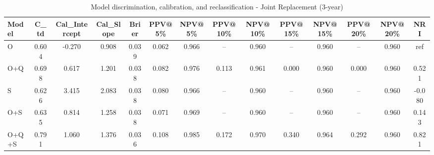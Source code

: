 \begin{table}[htbp]
\centering
\small
\caption{Model discrimination, calibration, and reclassification - Joint Replacement (3-year)}
\label{tab:perf_joint_3y}
\begin{tabular}{lccccccccccccc}
\toprule
Model & C\_td & Cal\_Intercept & Cal\_Slope & Brier & PPV@5\% & NPV@5\% & PPV@10\% & NPV@10\% & PPV@15\% & NPV@15\% & PPV@20\% & NPV@20\% & NRI \\
\midrule
O & 0.604 & -0.270 & 0.908 & 0.039 & 0.062 & 0.966 & -- & 0.960 & -- & 0.960 & -- & 0.960 & ref \\
O+Q & 0.698 & 0.617 & 1.201 & 0.038 & 0.082 & 0.976 & 0.113 & 0.961 & 0.000 & 0.960 & 0.000 & 0.960 & 0.521 \\
S & 0.626 & 3.415 & 2.083 & 0.038 & 0.080 & 0.966 & -- & 0.960 & -- & 0.960 & -- & 0.960 & -0.080 \\
O+S & 0.635 & 0.814 & 1.258 & 0.038 & 0.071 & 0.969 & -- & 0.960 & -- & 0.960 & -- & 0.960 & 0.143 \\
O+Q+S & 0.791 & 1.060 & 1.376 & 0.036 & 0.108 & 0.985 & 0.172 & 0.970 & 0.340 & 0.964 & 0.292 & 0.960 & 0.821 \\
\bottomrule
\end{tabular}
\end{table}